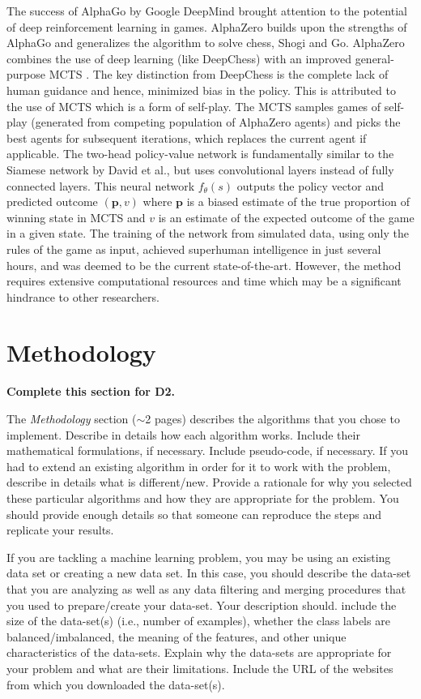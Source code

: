 \documentclass[letterpaper]{article} %
\begin{document}
The success of AlphaGo by Google DeepMind brought attention to the potential of deep reinforcement learning \cite{alphago2016} in games. AlphaZero builds upon the strengths of AlphaGo and generalizes the algorithm to solve chess, Shogi and Go. AlphaZero combines the use of deep learning (like DeepChess) with an improved general-purpose MCTS \cite{alphazero2018}. The key distinction from DeepChess is the complete lack of human guidance and hence, minimized bias in the policy. This is attributed to the use of MCTS which is a form of self-play. The MCTS samples games of self-play (generated from competing population of AlphaZero agents) and picks the best agents for subsequent iterations, which replaces the current agent if applicable. The two-head policy-value network is fundamentally similar to the Siamese network by David et al., but uses convolutional layers instead of fully connected layers. This neural network $f_\theta(s)$ outputs the policy vector and predicted outcome $(\textbf{p}, v)$ where $\textbf{p}$ is a biased estimate of the true proportion of winning state in MCTS and $v$ is an estimate of the expected outcome of the game in a given state. The training of the network from simulated data, using only the rules of the game as input, achieved superhuman intelligence in just several hours, and was deemed to be the current state-of-the-art. However, the method requires extensive computational resources and time which may be a significant hindrance to other researchers.


\section{Methodology}

{\bf Complete this section for D2.}

The {\it Methodology } section ($\sim$2 pages) describes the algorithms that you chose to implement.  Describe in details how each algorithm works.  Include their mathematical formulations, if necessary.  Include pseudo-code, if necessary.  If you had to extend an existing algorithm in order for it to work with the problem, describe in details what is different/new.  Provide a rationale for why you selected these particular algorithms and how they are appropriate for the problem.  You should provide enough details so that someone can reproduce the steps and replicate your results.  

If you are tackling a machine learning problem, you may be using an existing data set or creating a new data set.  In this case, you should describe the data-set that you are analyzing as well as any data filtering and merging procedures that you used to prepare/create your data-set.  Your description should. include the size of the data-set(s) (i.e., number of examples), whether the class labels are balanced/imbalanced, the meaning of the features, and other unique characteristics of the data-sets.   Explain why the data-sets are appropriate for your problem and what are their limitations.  Include the URL of the websites from which you downloaded the data-set(s).
\end{document}
